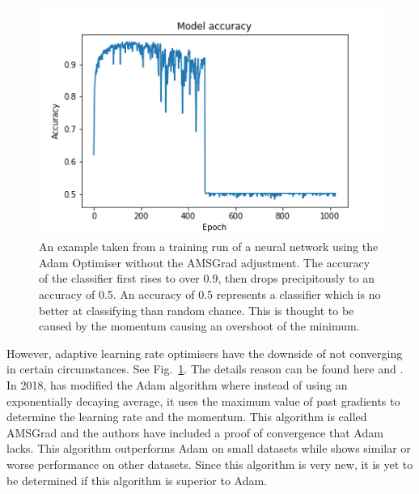 \documentclass[a4paper,fleqn,usenatbib]{mnras}
\begin{document}
 \begin{figure}
 \includegraphics[width=\columnwidth]{../Figures/CNN_zeroing_accuracy}	
 \caption{An example taken from a training run of a neural network using the Adam Optimiser without the AMSGrad adjustment. The accuracy of the classifier first rises to over 0.9, then drops precipitously to an accuracy of 0.5. An accuracy of 0.5 represents a classifier which is no better at classifying than random chance. This is thought to be caused by the momentum causing an overshoot of the minimum. \label{figure:zeroing}}
 \end{figure}

 However, adaptive learning rate optimisers have the downside of not converging in certain circumstances. See Fig.~\ref{figure:zeroing}. The details reason can be found here \cite{ObjectAMSGrad} and \cite{translateAMSGrad}. In 2018, \cite{AMSGrad} has modified the Adam algorithm where instead of using an exponentially decaying average, it uses the maximum value of past gradients to determine the learning rate and the momentum. This algorithm is called AMSGrad and the authors have included a proof of convergence that Adam lacks. This algorithm outperforms Adam on small datasets while shows similar or worse performance on other datasets. Since this algorithm is very new, it is yet to be determined if this algorithm is superior to Adam.
 
\end{document}

